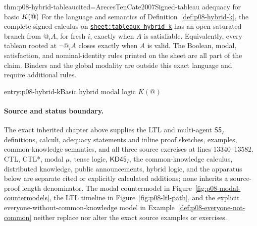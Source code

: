 \begin{hbtheorem}{thm:p08-hybrid-tableau}{cited=ArecesTenCate2007}{Signed-tableau adequacy for basic \(K({\char64})\)}
For the language and semantics of
Definition~\ref{def:p08-hybrid-k}, the complete signed calculus on
\hyperref[sheet:tableaux-hybrid-k]{\texttt{sheet:tableaux-hybrid-k}} has an
open saturated branch from \(@_iA\), for fresh \(i\), exactly when \(A\) is
satisfiable.  Equivalently, every tableau rooted at \(\neg@_iA\) closes exactly
when \(A\) is valid.  The Boolean, modal, satisfaction, and nominal-identity
rules printed on the sheet are all part of the claim.  Binders and the global
modality are outside this exact language and require additional rules.
\end{hbtheorem}

\begin{systementry}{entry:p08-hybrid-k}{Basic hybrid modal logic \(K(@)\)}
\end{systementry}

\paragraph{Source and status boundary.}
The exact inherited chapter above supplies the LTL and multi-agent
\(\mathsf{S5}_{I}\) definitions, calculi, adequacy statements and inline
proof sketches, examples, common-knowledge semantics, and all three source
exercises at lines 13340--13582.  CTL, CTL*, modal \(\mu\), tense logic,
\(\mathsf{KD45}_{I}\), the common-knowledge calculus, distributed
knowledge, public announcements, hybrid logic, and the apparatus below are
separate cited or explicitly calculated additions; none inherits a
source-proof length denominator.  The modal countermodel in
Figure~\ref{fig:p08-modal-countermodels}, the LTL timeline in
Figure~\ref{fig:p08-ltl-path}, and the explicit
everyone-without-common-knowledge model in
Example~\ref{def:p08-everyone-not-common} neither replace nor alter the
exact source examples or exercises.
